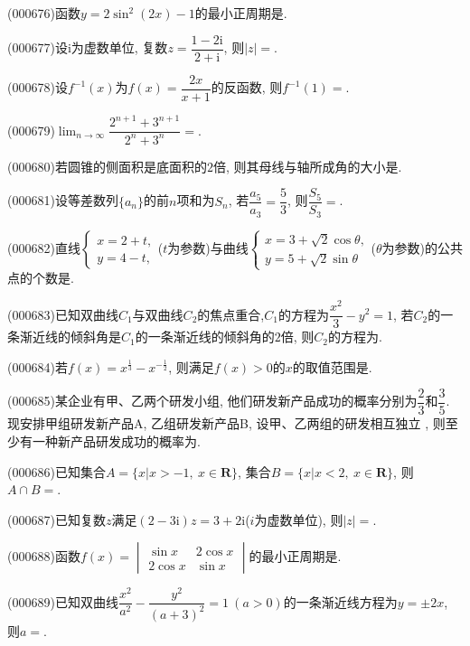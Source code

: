 \item (000676)函数$y=2\sin^2(2x)-1$的最小正周期是.
\item (000677)设$\mathrm{i}$为虚数单位, 复数$z=\dfrac{1-2 \mathrm{i}}{2+\mathrm{i}}$, 则$|z|=$.
\item (000678)设$f^{-1}(x)$为$f(x)=\dfrac{2x}{x+1}$的反函数, 则$f^{-1}(1)=$.
\item (000679)$\displaystyle\lim_{n\to\infty}\dfrac{2^{n+1}+3^{n+1}}{2^n+3^n}=$.
\item (000680)若圆锥的侧面积是底面积的$2$倍, 则其母线与轴所成角的大小是.
\item (000681)设等差数列$\{a_n\}$的前$n$项和为$S_n$, 若$\dfrac{a_5}{a_3}=\dfrac53$, 则$\dfrac{S_5}{S_3}=$.
\item (000682)直线$\begin{cases} x=2+t, \\ y=4-t,\end{cases}$($t$为参数)与曲线$\begin{cases} x=3+\sqrt2\cos\theta, \\ y=5+\sqrt2\sin\theta \end{cases}$($\theta$为参数)的公共点的个数是.
\item (000683)已知双曲线$C_1$与双曲线$C_2$的焦点重合,$C_1$的方程为$\dfrac{x^2}3-{y^2}=1$, 若$C_2$的一条渐近线的倾斜角是$C_1$的一条渐近线的倾斜角的$2$倍, 则$C_2$的方程为.
\item (000684)若$f(x)={x^{\frac13}}-{x^{-\frac12}}$, 则满足$f(x)>0$的$x$的取值范围是.
\item (000685)某企业有甲、乙两个研发小组, 他们研发新产品成功的概率分别为$\dfrac23$和$\dfrac35$. 现安排甲组研发新产品A, 乙组研发新产品B, 设甲、乙两组的研发相互独立 , 则至少有一种新产品研发成功的概率为.
\item (000686)已知集合$A=\{x|x>-1, \ x\in \mathbf{R}\}$, 集合$B=\{x|x<2, \ x\in \mathbf{R}\}$, 则$A\cap B=$.
\item (000687)已知复数$z$满足$(2-3\mathrm{i})z=3+2\mathrm{i}$($i$为虚数单位), 则$|z|=$.
\item (000688)函数$f(x)=\begin{vmatrix} \sin x & 2\cos x \\ 2\cos x & \sin x\end{vmatrix}$的最小正周期是.
\item (000689)已知双曲线$\dfrac{x^2}{a^2}-\dfrac{y^2}{(a+3)^2}=1 \ (a>0)$的一条渐近线方程为$y=\pm 2x$, 则$a=$.
